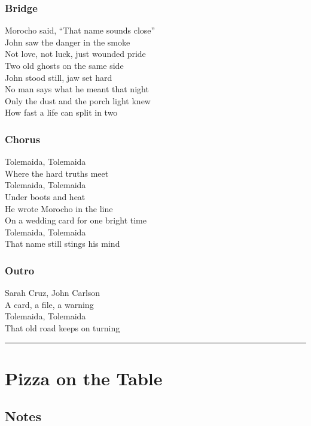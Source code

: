 \subsubsection{Bridge}\label{bridge-8}

Morocho said, ``That name sounds close''\\
John saw the danger in the smoke\\
Not love, not luck, just wounded pride\\
Two old ghosts on the same side\\
John stood still, jaw set hard\\
No man says what he meant that night\\
Only the dust and the porch light knew\\
How fast a life can split in two

\subsubsection{Chorus}\label{chorus-28}

Tolemaida, Tolemaida\\
Where the hard truths meet\\
Tolemaida, Tolemaida\\
Under boots and heat\\
He wrote Morocho in the line\\
On a wedding card for one bright time\\
Tolemaida, Tolemaida\\
That name still stings his mind

\subsubsection{Outro}\label{outro-1}

Sarah Cruz, John Carlson\\
A card, a file, a warning\\
Tolemaida, Tolemaida\\
That old road keeps on turning

\begin{center}\rule{0.5\linewidth}{0.5pt}\end{center}

\section{Pizza on the Table}\label{pizza-on-the-table}

\subsection{Notes}\label{notes-14}

